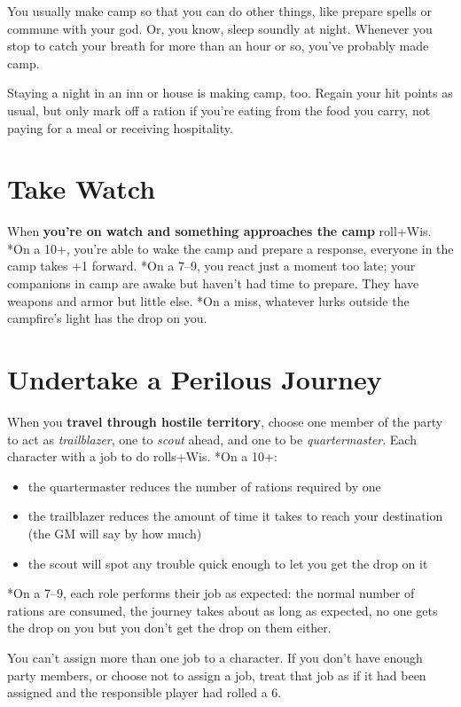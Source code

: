 You usually make camp so that you can do other things, like prepare spells or commune with your god. Or, you know, sleep soundly at night. Whenever you stop to catch your breath for more than an hour or so, you've probably made camp.

Staying a night in an inn or house is making camp, too. Regain your hit points as usual, but only mark off a ration if you're eating from the food you carry, not paying for a meal or receiving hospitality.
\section*{Take Watch}
\HRule
When \textbf{you're on watch and something approaches the camp}
roll+Wis. *On a 10+, you're able to wake the camp and prepare a response, everyone in the camp takes +1 forward. *On a 7--9, you react just a moment too late; your companions in camp are awake but haven't had time to prepare. They have weapons and armor but little else. *On a miss, whatever lurks outside the campfire's light has the drop on you.
\HRule
\section*{Undertake a Perilous Journey}
\HRule
When you \textbf{travel through hostile territory}, choose one member of the party to act as \emph{trailblazer}, one to \emph{scout} ahead, and one to be \emph{quartermaster}. Each character with a job to do rolls+Wis. *On a 10+:
\begin{itemize}
\item the quartermaster reduces the number of rations required by one
\item the trailblazer reduces the amount of time it takes to reach your destination (the GM will say by how much)
\item the scout will spot any trouble quick enough to let you get the drop on it
\end{itemize}
\HRule

*On a 7--9, each role performs their job as expected: the normal number of rations are consumed, the journey takes about as long as expected, no one gets the drop on you but you don't get the drop on them either.

You can't assign more than one job to a character. If you don't have enough party members, or choose not to assign a job, treat that job as if it had been assigned and the responsible player had rolled a 6.

